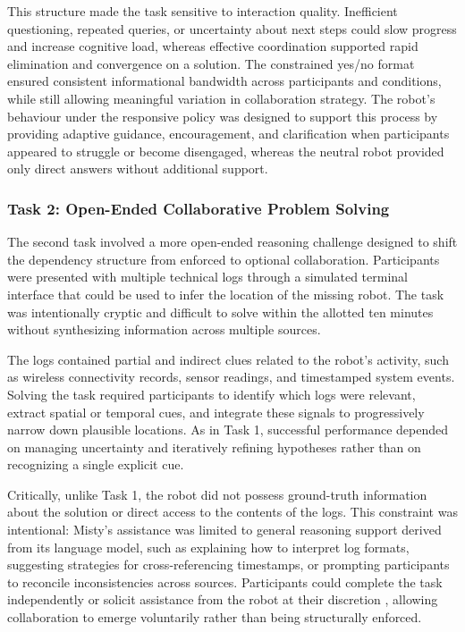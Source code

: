 \documentclass[
  authoryear,
  doubleblind,
  3p]{elsarticle}
\begin{document}
This structure made the task sensitive to interaction quality.
Inefficient questioning, repeated queries, or uncertainty about next
steps could slow progress and increase cognitive load, whereas effective
coordination supported rapid elimination and convergence on a solution.
The constrained yes/no format ensured consistent informational bandwidth
across participants and conditions, while still allowing meaningful
variation in collaboration strategy. The robot's behaviour under the
responsive policy was designed to support this process by providing
adaptive guidance, encouragement, and clarification when participants
appeared to struggle or become disengaged, whereas the neutral robot
provided only direct answers without additional support.

\subsubsection{Task 2: Open-Ended Collaborative Problem
Solving}\label{task-2-open-ended-collaborative-problem-solving}

The second task involved a more open-ended reasoning challenge designed
to shift the dependency structure from enforced to optional
collaboration. Participants were presented with multiple technical logs
through a simulated terminal interface that could be used to infer the
location of the missing robot. The task was intentionally cryptic and
difficult to solve within the allotted ten minutes without synthesizing
information across multiple sources.

The logs contained partial and indirect clues related to the robot's
activity, such as wireless connectivity records, sensor readings, and
timestamped system events. Solving the task required participants to
identify which logs were relevant, extract spatial or temporal cues, and
integrate these signals to progressively narrow down plausible
locations. As in Task 1, successful performance depended on managing
uncertainty and iteratively refining hypotheses rather than on
recognizing a single explicit cue.

Critically, unlike Task 1, the robot did not possess ground-truth
information about the solution or direct access to the contents of the
logs. This constraint was intentional: Misty's assistance was limited to
general reasoning support derived from its language model, such as
explaining how to interpret log formats, suggesting strategies for
cross-referencing timestamps, or prompting participants to reconcile
inconsistencies across sources. Participants could complete the task
independently or solicit assistance from the robot at their discretion
\citep{lin2022}, allowing collaboration to emerge voluntarily rather
than being structurally enforced.
\end{document}
